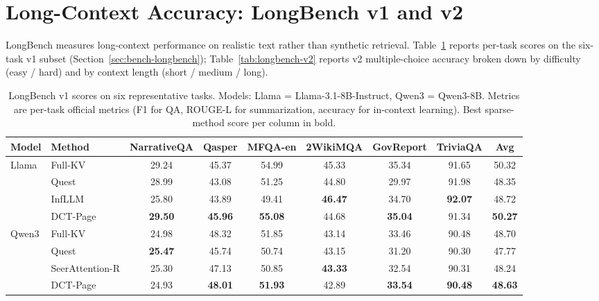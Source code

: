 \section{Long-Context Accuracy: LongBench v1 and v2}\label{sec:results-longbench}

LongBench measures long-context performance on realistic text rather
than synthetic retrieval.  Table~\ref{tab:longbench-v1} reports
per-task scores on the six-task v1 subset (Section~\ref{sec:bench-longbench});
Table~\ref{tab:longbench-v2} reports v2 multiple-choice accuracy
broken down by difficulty (easy / hard) and by context length
(short / medium / long).


\begin{table}[ht]
  \centering
  \caption[LongBench v1 per-task scores.]
  {LongBench v1 scores on six representative tasks.  Models:
   Llama = Llama-3.1-8B-Instruct, Qwen3 = Qwen3-8B.  Metrics are
   per-task official metrics (F1 for QA, ROUGE-L for summarization,
   accuracy for in-context learning).  Best sparse-method score per
   column in bold.}
  \label{tab:longbench-v1}
  \centering
  \footnotesize
  \setlength{\tabcolsep}{4pt}
  \begin{tabular}{l l c c c c c c c}
    \toprule
    Model & Method
      & NarrativeQA & Qasper & MFQA-en
      & 2WikiMQA & GovReport & TriviaQA
      & Avg \\
    \midrule
    \multirow{4}{*}{Llama}
      & Full-KV  & 29.24 & 45.37 & 54.99 & 45.33 & 35.34 & 91.65 & 50.32 \\
      & Quest    & 28.99 & 43.08 & 51.25 & 44.80 & 29.97 & 91.98 & 48.35 \\
      & InfLLM   & 25.80 & 43.89 & 49.41 & \textbf{46.47} & 34.70 & \textbf{92.07} & 48.72 \\
      & DCT-Page & \textbf{29.50} & \textbf{45.96} & \textbf{55.08} & 44.68 & \textbf{35.04} & 91.34 & \textbf{50.27} \\
    \midrule
    \multirow{4}{*}{Qwen3}
      & Full-KV         & 24.98 & 48.32 & 51.85 & 43.14 & 33.46 & 90.48 & 48.70 \\
      & Quest           & \textbf{25.47} & 45.74 & 50.74 & 43.15 & 31.20 & 90.30 & 47.77 \\
      & SeerAttention-R & 25.30 & 47.13 & 50.85 & \textbf{43.33} & 32.54 & 90.31 & 48.24 \\
      & DCT-Page        & 24.93 & \textbf{48.01} & \textbf{51.93} & 42.89 & \textbf{33.54} & \textbf{90.48} & \textbf{48.63} \\
    \bottomrule
  \end{tabular}
\end{table}

